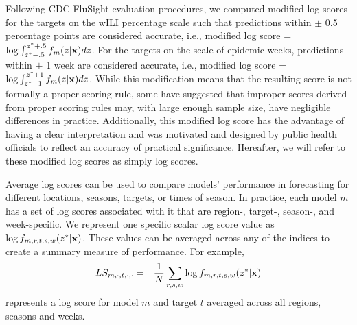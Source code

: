 \documentclass[9pt,twocolumn,twoside]{pnas-new}\usepackage[]{graphicx}\usepackage[]{color}
\begin{document}
{Following CDC FluSight evaluation procedures, we computed modified log-scores for the targets on the wILI percentage scale such that predictions within $\pm$ 0.5 percentage points are considered accurate, i.e., modified log score = $\log \int_{z^* -.5}^{z^* + .5} f_m(z|{\bf{x}})dz$. 
For the targets on the scale of epidemic weeks, predictions within $\pm$ 1 week are considered accurate, i.e., modified log score = $\log \int_{z^* -1}^{z^* + 1} f_m(z|{\bf{x}})dz$. 
While this modification means that the resulting score is not formally a proper scoring rule, some have suggested that improper scores derived from proper scoring rules may, with large enough sample size, have negligible differences in practice.\cite{Gneiting2007} %
Additionally, this modified log score has the advantage of having a clear interpretation and was  motivated and designed by public health officials to reflect an accuracy of practical significance.
Hereafter, we will refer to these modified log scores as simply log scores.

Average log scores can be used to compare models' performance in forecasting for different locations, seasons, targets, or times of season.
In practice, each model $m$ has a set of log scores associated with it that are region-, target-, season-, and week-specific.
We represent one specific scalar log score value as $\log f_{m,r,t,s,w}(z^*|\bf{x})$. 
These values can be averaged across any of the indices to create a summary measure of performance.
For example,
\begin{eqnarray}
LS_{m,\cdot,t,\cdot,\cdot} & = & \frac{1}{N} \sum_{r,s,w} \log f_{m,r,t,s,w}(z^*|{\bf x}) \label{eqn:logscore}
\end{eqnarray}
represents a log score for model $m$ and target $t$ averaged across all regions, seasons and weeks.

}
\end{document}
